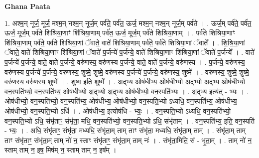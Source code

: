 \documentclass[17pt]{extarticle}
\begin{document}
\textbf{Ghana Paata } \newline

1. अश्म॒न् नूर्ज॒ मूर्ज॒ मश्म॒न् नश्म॒न् नूर्ज॒म् पर्व॑ते॒ पर्व॑त॒ ऊर्ज॒ मश्म॒न् नश्म॒न् नूर्ज॒म् पर्व॑ते । . ऊर्ज॒म् पर्व॑ते॒ पर्व॑त॒ ऊर्ज॒ मूर्ज॒म् पर्व॑ते शिश्रिया॒णाꣳ शि॑श्रिया॒णाम् पर्व॑त॒ ऊर्ज॒ मूर्ज॒म् पर्व॑ते शिश्रिया॒णाम् । . पर्व॑ते शिश्रिया॒णाꣳ शि॑श्रिया॒णाम् पर्व॑ते॒ पर्व॑ते शिश्रिया॒णां ॅवाते॒ वाते॑ शिश्रिया॒णाम् पर्व॑ते॒ पर्व॑ते शिश्रिया॒णां ॅवाते᳚ । . शि॒श्रि॒या॒णां ॅवाते॒ वाते॑ शिश्रिया॒णाꣳ शि॑श्रिया॒णां ॅवाते॑ प॒र्जन्ये॑ प॒र्जन्ये॒ वाते॑ शिश्रिया॒णाꣳ शि॑श्रिया॒णां ॅवाते॑ प॒र्जन्ये᳚ । . वाते॑ प॒र्जन्ये॑ प॒र्जन्ये॒ वाते॒ वाते॑ प॒र्जन्ये॒ वरु॑णस्य॒ वरु॑णस्य प॒र्जन्ये॒ वाते॒ वाते॑ प॒र्जन्ये॒ वरु॑णस्य । . प॒र्जन्ये॒ वरु॑णस्य॒ वरु॑णस्य प॒र्जन्ये॑ प॒र्जन्ये॒ वरु॑णस्य॒ शुष्मे॒ शुष्मे॒ वरु॑णस्य प॒र्जन्ये॑ प॒र्जन्ये॒ वरु॑णस्य॒ शुष्मे᳚ । . वरु॑णस्य॒ शुष्मे॒ शुष्मे॒ वरु॑णस्य॒ वरु॑णस्य॒ शुष्मे᳚ । . शुष्म॒ इति॒ शुष्मे᳚ । . अ॒द्भ्य ओष॑धीभ्य॒ ओष॑धीभ्यो अ॒द्भ्यो अ॒द्भ्य ओष॑धीभ्यो॒ वन॒स्पति॑भ्यो॒ वन॒स्पति॑भ्य॒ ओष॑धीभ्यो अ॒द्भ्यो अ॒द्भ्य ओष॑धीभ्यो॒ वन॒स्पति॑भ्यः । . अ॒द्भ्य इत्य॑त् - भ्यः । . ओष॑धीभ्यो॒ वन॒स्पति॑भ्यो॒ वन॒स्पति॑भ्य॒ ओष॑धीभ्य॒ ओष॑धीभ्यो॒ वन॒स्पति॒भ्यो ऽध्यधि॒ वन॒स्पति॑भ्य॒ ओष॑धीभ्य॒ ओष॑धीभ्यो॒ वन॒स्पति॒भ्यो ऽधि॑ । . ओष॑धीभ्य॒ इत्योष॑धि - भ्यः॒ । . वन॒स्पति॒भ्यो ऽध्यधि॒ वन॒स्पति॑भ्यो॒ वन॒स्पति॒भ्यो ऽधि॒ संभृ॑ताꣳ॒॒ संभृ॑ता॒ मधि॒ वन॒स्पति॑भ्यो॒ वन॒स्पति॒भ्यो ऽधि॒ संभृ॑ताम् । . वन॒स्पति॑भ्य॒ इति॒ वन॒स्पति॑ - भ्यः॒ । . अधि॒ संभृ॑ताꣳ॒॒ संभृ॑ता॒ मध्यधि॒ संभृ॑ता॒म् ताम् ताꣳ संभृ॑ता॒ मध्यधि॒ संभृ॑ता॒म् ताम् । . संभृ॑ता॒म् ताम् ताꣳ संभृ॑ताꣳ॒॒ संभृ॑ता॒म् ताम् नो॑ न॒ स्ताꣳ संभृ॑ताꣳ॒॒ संभृ॑ता॒म् ताम् नः॑ । . संभृ॑ता॒मिति॒ सं - भृ॒ता॒म् । . ताम् नो॑ न॒ स्ताम् ताम् न॒ इष॒ मिष॑म् न॒ स्ताम् ताम् न॒ इष᳚म् । \newline
\end{document}
